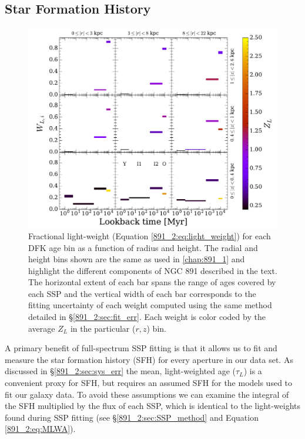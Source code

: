 \subsection{Star Formation History}
\label{891_2:sec:SFH}
\begin{figure}
  \centering
  \includegraphics[width=\textwidth]{891_2/figs/SFH_cuts.pdf}
  \caption[SSP light weights in ($r,|z|$)
    grid]{\fixspacing\label{891_2:fig:SFH_cuts}Fractional light-weight
    (Equation \ref{891_2:eq:light_weight}) for each DFK age bin as a
    function of radius and height. The radial and height bins shown
    are the same as used in \ref{chap:891_1} and highlight the
    different components of NGC 891 described in the text. The
    horizontal extent of each bar spans the range of ages covered by
    each SSP and the vertical width of each bar corresponds to the
    fitting uncertainty of each weight computed using the same method
    detailed in \S\ref{891_2:sec:fit_err}. Each weight is color coded
    by the average $Z_L$ in the particular ($r,z$) bin.  }

\end{figure}

A primary benefit of full-spectrum SSP fitting is that it allows us to
fit and measure the star formation history (SFH) for every aperture in
our data set. As discussed in \S\ref{891_2:sec:sys_err} the mean,
light-weighted age ($\tau_L$) is a convenient proxy for SFH, but
requires an assumed SFH for the models used to fit our galaxy data. To
avoid these assumptions we can examine the integral of the SFH
multiplied by the flux of each SSP, which is identical to the
light-weights found during SSP fitting (see
\S\ref{891_2:sec:SSP_method} and Equation \ref{891_2:eq:MLWA}).

